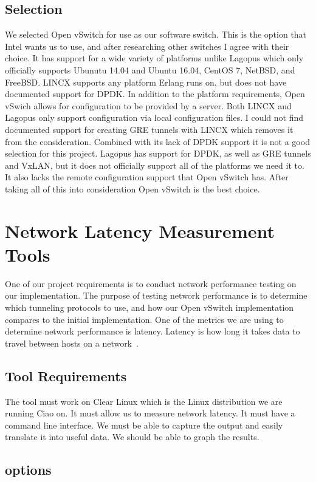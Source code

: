 \documentclass[10pt,letterpaper,onecolumn,draftclsnofoot]{IEEEtran}
\begin{document}
\subsection{Selection}
We selected Open vSwitch for use as our software switch. 
This is the option that Intel wants us to use, and after researching other switches I agree with their choice.
It has support for a wide variety of platforms unlike Lagopus which only officially supports Ubunutu 14.04 and Ubuntu 16.04, CentOS 7, NetBSD, and FreeBSD.
LINCX supports any platform Erlang runs on, but does not have documented support for DPDK.
In addition to the platform requirements, Open vSwich allows for configuration to be provided by a server.
Both LINCX and Lagopus only support configuration via local configuration files.
I could not find documented support for creating GRE tunnels with LINCX which removes it from the consideration.
Combined with its lack of DPDK support it is not a good selection for this project.
Lagopus has support for DPDK, as well as GRE tunnels and VxLAN, but it does not officially support all of the platforms we need it to. 
It also lacks the remote configuration support that Open vSwitch has.
After taking all of this into consideration Open vSwitch is the best choice.


\section{Network Latency Measurement Tools}
One of our project requirements is to conduct network performance testing on our implementation.
The purpose of testing network performance is to determine which tunneling protocols to use, 
and how our Open vSwitch implementation compares to the initial implementation.
One of the metrics we are using to determine network performance is latency.
Latency is how long it takes data to travel between hosts on a network~\cite{topdown-ssl}.

\subsection{Tool Requirements}
The tool must work on Clear Linux which is the Linux distribution we are running Ciao on.
It must allow us to measure network latency. 
It must have a command line interface.
We must be able to capture the output and easily translate it into useful data. 
We should be able to graph the results. 

\subsection{options}
\end{document}
